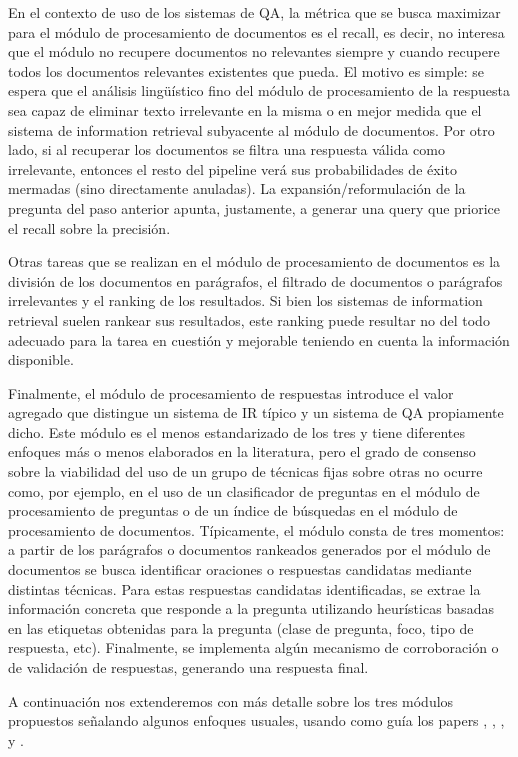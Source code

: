 En el contexto de uso de los sistemas de QA, la métrica que se busca maximizar para el módulo de procesamiento de documentos es el recall, es decir, no interesa que el módulo no recupere documentos no relevantes siempre y cuando recupere todos los documentos relevantes existentes que pueda. El motivo es simple: se espera que el análisis lingüístico fino del módulo de procesamiento de la respuesta sea capaz de eliminar texto irrelevante en la misma o en mejor medida que el sistema de information retrieval subyacente al módulo de documentos. Por otro lado, si al recuperar los documentos se filtra una respuesta válida como irrelevante, entonces el resto del pipeline verá sus probabilidades de éxito mermadas (sino directamente anuladas).  La expansión/reformulación de la pregunta del paso anterior apunta, justamente, a generar una query que priorice el recall sobre la precisión. 

Otras tareas que se realizan en el módulo de procesamiento de documentos es la división de los documentos en parágrafos, el filtrado de documentos o parágrafos irrelevantes y el ranking de los resultados. Si bien los sistemas de information retrieval suelen rankear sus resultados, este ranking puede resultar no del todo adecuado para la tarea en cuestión y mejorable teniendo en cuenta la información disponible. 

Finalmente, el módulo de procesamiento de respuestas introduce el valor agregado que distingue un sistema de IR típico y un sistema de QA propiamente dicho. Este módulo es el menos estandarizado de los tres y tiene diferentes enfoques más o menos elaborados en la literatura, pero el grado de consenso sobre la viabilidad del uso de un grupo de técnicas fijas sobre otras no ocurre como, por ejemplo, en el uso de un clasificador de preguntas en el módulo de procesamiento de preguntas o de un índice de búsquedas en el módulo de procesamiento de documentos. Típicamente, el módulo consta de tres momentos:  a partir de los parágrafos o documentos rankeados generados por el módulo de documentos se busca identificar oraciones o respuestas candidatas mediante distintas técnicas. Para estas respuestas candidatas identificadas, se extrae la información concreta que responde a la pregunta utilizando heurísticas basadas en las etiquetas obtenidas para la pregunta (clase de pregunta, foco, tipo de respuesta, etc). Finalmente, se implementa algún mecanismo de corroboración o de validación de respuestas, generando una respuesta final.

A continuación nos extenderemos con más detalle sobre los tres módulos propuestos señalando algunos enfoques usuales, usando como guía los papers \cite{QA-survey}, \cite{QA1}, \cite{QA2}, \cite{QA3} y \cite{PASSAGE1}.

